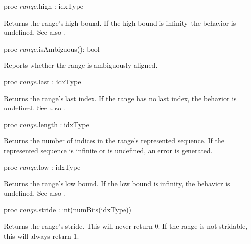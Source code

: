 \begin{protohead}
proc $range$.high : idxType
\end{protohead}
\begin{protobody}
Returns the range's high bound.
If the high bound is infinity, the behavior is undefined.
See also .
\end{protobody}


\begin{protohead}
proc $range$.isAmbiguous(): bool
\end{protohead}
\begin{protobody}
Reports whether the range is ambiguously aligned.
\end{protobody}

\begin{protohead}
proc $range$.last : idxType
\end{protohead}
\begin{protobody}
Returns the range's last index.
If the range has no last index, the behavior is undefined.
See also .
\end{protobody}

\begin{protohead}
proc $range$.length : idxType
\end{protohead}
\begin{protobody}
Returns the number of indices in the range's represented sequence.
If the represented sequence is infinite or is undefined,
an error is generated.
\end{protobody}

\begin{protohead}
proc $range$.low : idxType
\end{protohead}
\begin{protobody}
Returns the range's low bound.
If the low bound is infinity, the behavior is undefined.
See also .
\end{protobody}

\begin{protohead}
proc $range$.stride : int(numBits(idxType))
\end{protohead}
\begin{protobody}
Returns the range's stride. This will never return 0.
If the range is not stridable, this will always return 1.
\end{protobody}

